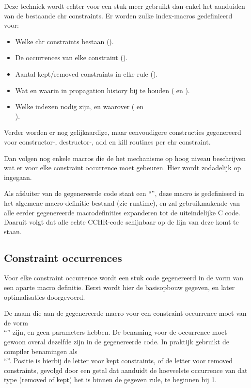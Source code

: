 Deze techniek wordt echter voor een stuk meer gebruikt dan enkel het aanduiden van de bestaande chr constraints. Er worden zulke index-macros gedefinieerd voor: \begin{itemize}
\item Welke chr constraints bestaan ().
\item De occurrences van elke constraint ().
\item Aantal kept/removed constraints in elke rule ().
\item Wat en waarin in propagation history bij te houden ( en ).
\item Welke indexen nodig zijn, en waarover ( en \\ ).
\end{itemize}
Verder worden er nog gelijkaardige, maar eenvoudigere constructies gegenereerd voor constructor-, destructor-, add en kill routines per chr constraint.

Dan volgen nog enkele macros die de het mechanisme op hoog niveau beschrijven wat er voor elke constraint occurrence moet gebeuren. Hier wordt zodadelijk op ingegaan.

Als afsluiter van de gegenereerde code staat een ``'', deze macro is gedefinieerd in het algemene macro-definitie bestand (zie runtime), en zal gebruikmakende van alle eerder gegenereerde macrodefinities expanderen tot de uiteindelijke C code. Daaruit volgt dat alle echte CCHR-code schijnbaar op de lijn van deze  komt te staan.

\subsection{Constraint occurrences} \label{gencode-conocc}

Voor elke constraint occurrence wordt een stuk code gegenereerd in de vorm van een aparte macro definitie. Eerst wordt hier de basisopbouw gegeven, en later optimalisaties doorgevoerd.

De naam die aan de gegenereerde macro voor een constraint occurrence moet van de vorm \\ ``'' zijn, en geen parameters hebben. De benaming voor de occurrence moet gewoon overal dezelfde zijn in de gegenereerde code. In praktijk gebruikt de compiler benamingen als \\ ``''. Positie is hierbij de letter  voor kept constraints, of de letter  voor removed constraints, gevolgd door een getal dat aanduidt de hoeveelste occurrence van dat type (removed of kept) het is binnen de gegeven rule, te beginnen bij 1.

